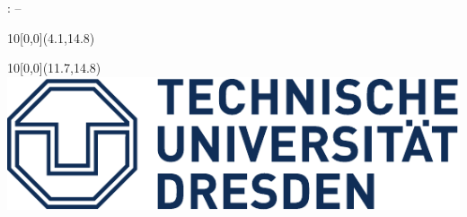 \begin{titlepage}
	\begin{center}
	\vspace{\baselineskip}
	\large{: \timestart \hspace*{0.25cm} -- \hspace*{0.25cm} \timeend}
	\end{center}	
	
	\begin{textblock}{10}[0,0](4.1,14.8)
	\end{textblock}
	\begin{textblock}{10}[0,0](11.7,14.8)
		\includegraphics[width=.4\textwidth]{images/logos/TU_Dresden_Logo_HKS41.pdf}
	\end{textblock}

\end{titlepage}
